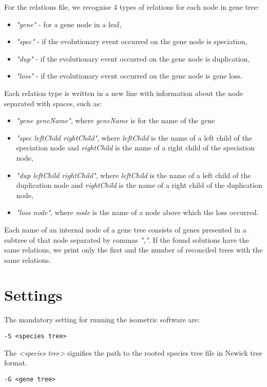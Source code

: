 \documentclass[12pt,a4paper,oneside]{book}
\begin{document}
For the relations file, we recognise 4 types of relations for each node in gene tree:
\begin{itemize}
  \item \emph{"gene"} - for a gene node in a leaf,
  \item \emph{"spec"} - if the evolutionary event occurred on the gene node is speciation,
  \item \emph{"dup"} - if the evolutionary event occurred on the gene node is duplication,
  \item \emph{"loss"} - if the evolutionary event occurred on the gene node is gene loss.
\end{itemize}
Each relation type is written in a new line with information about the node separated with spaces, such as:
\begin{itemize}
  \item \emph{"gene geneName"}, where \emph{geneName} is for the name of the gene
  \item \emph{"spec leftChild rightChild"}, where \emph{leftChild} is the name of a left child of the speciation node and \emph{rightChild} is the name of a right child of the speciation node,
  \item \emph{"dup leftChild rightChild"}, where \emph{leftChild} is the name of a left child of the duplication node and \emph{rightChild} is the name of a right child of the duplication node,
  \item \emph{"loss node"}, where \emph{node} is the name of a node above which the loss occurred.
\end{itemize}
Each name of an internal node of a gene tree consists of genes presented in a subtree of that node separated by commas \emph{","}. If the found solutions have the same relations, we print only the first and the number of reconciled trees with the same relations.

\chapter{Settings} \label{Settings}

The mandatory setting for running the isometric software are:

\begin{verbatim}-S <species tree>
\end{verbatim}

The \emph{<species tree>} signifies the path to the rooted species tree file in Newick tree format.

\begin{verbatim}-G <gene tree>
\end{verbatim}
\end{document}
